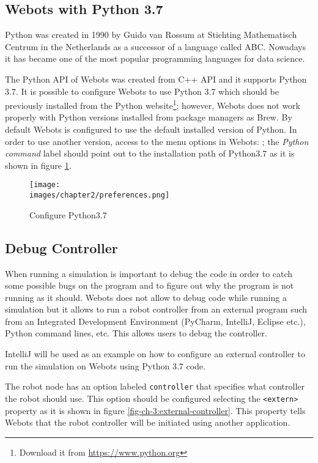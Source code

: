 \subsection{Webots with Python 3.7}

Python was created in 1990 by Guido van Rossum at Stichting Mathematisch Centrum in the Netherlands as a successor of a language called ABC\cite{python-docs}. Nowadays it has became one of the most popular programming languages for data science\cite{Raschka:2015:PML:2886323}.

The Python API of Webots was created from C++ API and it supports Python 3.7. It is possible to configure Webots to use Python 3.7 which should be previously installed from the Python website\footnote{Download it from \url{https://www.python.org}}; however, Webots does not work properly with Python versions installed from package managers as Brew. By default Webots is configured to use the default installed version of Python. In order to use another version, access to the menu options in Webots: ; the \textit{Python command} label should point out to the installation path of Python3.7 as it is shown in figure \ref{fig-ch-2:python}. 

\begin{figure}[ht]
	\texttt{[image: \\images/chapter2/preferences.png]}
	\caption{Configure Python3.7}
	\label{fig-ch-2:python}
\end{figure}

\subsection{Debug Controller}

When running a simulation is important to debug the code in order to catch some possible bugs on the program and to figure out why the program is not running as it should. Webots does not allow to debug code while running a simulation but it allows to run a robot controller from an external program such from an Integrated Development Environment (PyCharm, IntelliJ, Eclipse etc.), Python command lines, etc. This allows users to debug the controller. 

IntelliJ will be used as an example on how to configure an external controller to run the simulation on Webots using Python 3.7 code. 

The robot node has an option labeled \verb|controller| that specifies what controller the robot should use. This option should be configured selecting the \verb|<extern>| property as it is shown in figure \ref{fig-ch-3:external-controller}. This property tells Webots that the robot controller will be initiated using another application.

